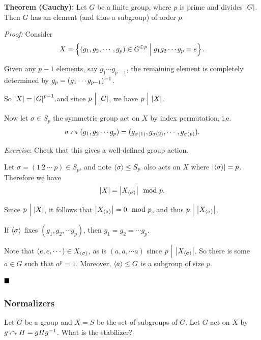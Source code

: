 \textbf{Theorem (Cauchy):} Let \(G\) be a finite group, where \(p\) is
prime and divides \({\left\lvert {G} \right\rvert}\). Then \(G\) has an element (and thus a
subgroup) of order \(p\).

\emph{Proof:} Consider
\begin{align*}
X = \left\{{(g_1, g_2, \cdots , g_p) \in G^{\oplus p} \mathrel{\Big|} g_1g_2\cdots g_p = e}\right\}
.\end{align*}

Given any \(p-1\) elements, say \(g_1 \cdots g_{p-1}\), the remaining
element is completely determined by \(g_p = (g_1 \cdots g_{p-1})^{-1}\).

So \({\left\lvert {X} \right\rvert} = {\left\lvert {G} \right\rvert}^{p-1}\).and since \(p {~\Bigm| ~} {\left\lvert {G} \right\rvert}\), we have
\(p {~\Bigm| ~} {\left\lvert {X} \right\rvert}\).

Now let \(\sigma \in S_p\) the symmetric group act on \(X\) by index
permutation, i.e.
\begin{align*}
\sigma \curvearrowright (g_1, g_2 \cdots g_p) = (g_{\sigma(1)}, g_{\sigma(2)}, \cdots, g_{\sigma(p)})
.\end{align*}

\emph{Exercise}: Check that this gives a well-defined group action.

Let \(\sigma = (1~2~\cdots~p) \in S_p\), and note
\(\left\langle{\sigma}\right\rangle \leq S_p\) also acts on \(X\) where
\({\left\lvert {\left\langle{\sigma}\right\rangle} \right\rvert} = p\). Therefore we have
\begin{align*}
{\left\lvert {X} \right\rvert} = {\left\lvert {X_{\left\langle{\sigma}\right\rangle}} \right\rvert} \mod p.
\end{align*}

Since \(p{~\Bigm| ~} {\left\lvert {X} \right\rvert}\), it follows that
\({\left\lvert {X_{\left\langle{\sigma}\right\rangle}} \right\rvert} = 0 \mod p\), and thus
\(p {~\Bigm| ~} {\left\lvert {X_{\left\langle{\sigma}\right\rangle}} \right\rvert}\).

If \(\left\langle{\sigma}\right\rangle\) fixes \((g_1, g_2, \cdots g_p)\), then
\(g_1 = g_2 = \cdots g_p\).

Note that \((e, e, \cdots) \in X_{\left\langle{\sigma}\right\rangle}\), as is
\((a, a, \cdots a)\) since \(p {~\Bigm| ~} {\left\lvert {X_{\left\langle{\sigma}\right\rangle}} \right\rvert}\).
So there is some \(a\in G\) such that \(a^p = 1\). Moreover,
\(\left\langle{a}\right\rangle \leq G\) is a subgroup of size \(p\).

\(\qed\)

\hypertarget{normalizers}{%
\subsubsection{Normalizers}\label{normalizers}}

Let \(G\) be a group and \(X = S\) be the set of subgroups of \(G\). Let
\(G\) act on \(X\) by \(g\curvearrowright H = gHg^{-1}\). What is the stabilizer?

